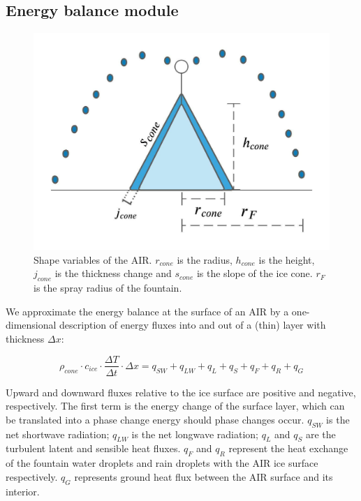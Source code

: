 \subsection{Energy balance module} \label{sec:energy}

\begin{figure}
	\begin{center}
		\includegraphics[width=10 cm]{figs/AIR_schematic.jpeg}
	\end{center}
	\caption{Shape variables of the AIR. $r_{cone}$ is the radius, $h_{cone}$ is the height, $j_{cone}$ is the
		thickness change and $s_{cone}$ is the slope of the ice cone. $r_F$ is the spray radius of the fountain.}
	\label{fig:shape}
\end{figure}

We approximate the energy balance at the surface of an AIR by a one-dimensional description of energy fluxes
into and out of a (thin) layer with thickness $\Delta x$:

\begin{equation}
	\rho_{cone} \cdot c_{ice} \cdot \frac{\Delta T}{\Delta t} \cdot \Delta x = q_{SW} + q_{LW} + q_{L} + q_{S} + q_{F}+ q_{R} + q_{G}
	\label{eqn:EB}
\end{equation}

Upward and downward fluxes relative to the ice surface are positive and negative, respectively. The first term
is the energy change of the surface layer, which can be translated into a phase change energy should phase
changes occur. $q_{SW}$ is the net shortwave radiation; $q_{LW}$ is the net longwave radiation; $q_{L}$ and
$q_{S}$ are the turbulent latent and sensible heat fluxes. $q_{F}$ and $q_{R}$ represent the heat exchange of
the fountain water droplets and rain droplets with the AIR ice surface respectively. $q_{G}$ represents ground
heat flux between the AIR surface and its interior.


